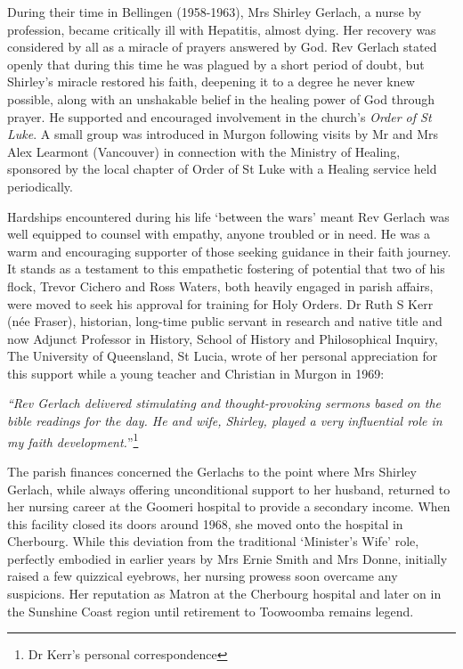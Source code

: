 During their time in Bellingen (1958-1963), Mrs Shirley Gerlach, a nurse by profession, became critically ill with Hepatitis, almost dying. Her recovery was considered by all as a miracle of prayers answered by God. Rev Gerlach stated openly that during this time he was plagued by a short period of doubt, but Shirley's miracle restored his faith, deepening it to a degree he never knew possible, along with an unshakable belief in the healing power of God through prayer. He supported and encouraged involvement in the church's \emph{Order of St Luke}. A small group was introduced in Murgon following visits by Mr and Mrs Alex Learmont (Vancouver) in connection with the Ministry of Healing, sponsored by the local chapter of Order of St Luke with a Healing service held periodically.



Hardships encountered during his life `between the wars' meant Rev Gerlach was well equipped to counsel with empathy, anyone troubled or in need. He was a warm and encouraging supporter of those seeking guidance in their faith journey. It stands as a testament to this empathetic fostering of potential that two of his flock, Trevor Cichero and Ross Waters, both heavily engaged in parish affairs, were moved to seek his approval for training for Holy Orders. Dr Ruth S Kerr (née Fraser), historian, long-time public servant in research and native title and now Adjunct Professor in History, School of History and Philosophical Inquiry, The University of Queensland, St Lucia, wrote of her personal appreciation for this support while a young teacher and Christian in Murgon in 1969:



\emph{``Rev Gerlach delivered stimulating and thought-provoking sermons based on the bible readings for the day. He and wife, Shirley, played a very influential role in my faith development.}''\footnote{Dr Kerr's personal correspondence}


The parish finances concerned the Gerlachs to the point where Mrs Shirley Gerlach, while always offering unconditional support to her husband, returned to her nursing career at the Goomeri hospital to provide a secondary income. When this facility closed its doors around 1968, she moved onto the hospital in Cherbourg. While this deviation from the traditional `Minister's Wife' role, perfectly embodied in earlier years by Mrs Ernie Smith and Mrs Donne, initially raised a few quizzical eyebrows, her nursing prowess soon overcame any suspicions. Her reputation as Matron at the Cherbourg hospital and later on in the Sunshine Coast region until retirement to Toowoomba remains legend.



